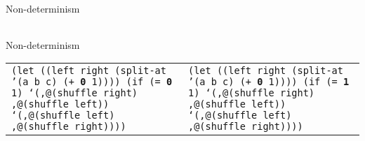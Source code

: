 \begin{frame}{Non-determinism}
\begin{tabularx}{\textwidth}{ X X }
  \end{tabularx}
\end{frame}


\begin{frame}{Non-determinism}
  \tiny
  \begin{tabularx}{\textwidth}{ X X }
    \texttt{(let ((left right (split-at '(a b c)\newline
      \hphantom{\_\_\_\_\_\_\_\_\_\_\_\_\_\_\_\_\_\_\_}
      (+ \textbf{0} 1))))\newline
      \hphantom{\_\_}(if (= \textbf{0} 1)\newline
      \hphantom{\_\_\_\_\_\_}`(,@(shuffle right)\newline
      \hphantom{ \_\_\_\_\_\_\_},@(shuffle left))\newline
      \hphantom{ \_\_\_\_}`(,@(shuffle left)\newline
      \hphantom{ \_\_\_\_\_\_},@(shuffle right))))\newline
      \ 
    }
    &
    \texttt{(let ((left right (split-at '(a b c)\newline
      \hphantom{\_\_\_\_\_\_\_\_\_\_\_\_\_\_\_\_\_\_\_}
      (+ \textbf{0} 1))))\newline
      \hphantom{\_\_}(if (= \textbf{1} 1)\newline
      \hphantom{\_\_\_\_\_\_}`(,@(shuffle right)\newline
      \hphantom{ \_\_\_\_\_\_\_},@(shuffle left))\newline
      \hphantom{ \_\_\_\_}`(,@(shuffle left)\newline
      \hphantom{ \_\_\_\_\_\_},@(shuffle right))))\newline
      \ 
    }

    \\
    

\end{tabularx}
\end{frame}

